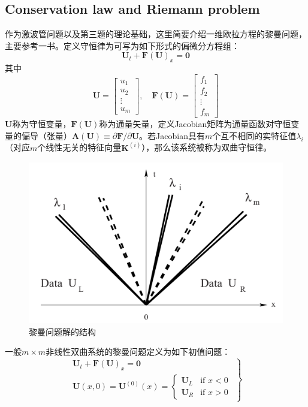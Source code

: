\documentclass[11pt]{article}
\begin{document}
\subsection{Conservation law and Riemann problem}
作为激波管问题以及第三题的理论基础，这里简要介绍一维欧拉方程的黎曼问题，主要参考\citet{toro_riemann_2009}一书。定义守恒律为可写为如下形式的偏微分方程组：
\begin{equation}
	\bm{U}_t+\bm{F}(\bm{U})_x=\bm{0}
\end{equation}
其中
\begin{equation}
	\bm{U}=\left[\begin{matrix}
			u_1    \\
			u_2    \\
			\vdots \\
			u_m
		\end{matrix}\right],\quad
	\bm{F}(\bm{U})=\left[\begin{matrix}
			f_1    \\
			f_2    \\
			\vdots \\
			f_m
		\end{matrix}\right]
\end{equation}
$\bm{U}$称为守恒变量，$\bm{F}(\bm{U})$称为通量矢量，定义Jacobian矩阵为通量函数对守恒变量的偏导（张量）$\bm{A}(\bm{U})\equiv\partial\bm{F}/\partial\bm{U}$。若Jacobian具有$m$个互不相同的实特征值$\lambda_i$（对应$m$个线性无关的特征向量$\bm{K}^{(i)}$），那么该系统被称为双曲守恒律。

\begin{figure}[htbp]
	\centering
	\includegraphics[width=.4\linewidth]{figure/shocktube/riemann.png}
	\caption{\label{fig:riemann}黎曼问题解的结构}
\end{figure}

一般$m\times m$非线性双曲系统的黎曼问题定义为如下初值问题：
\begin{equation}
	\left.\begin{array}{l}
		\bm{U}_t+\bm{F}(\bm{U})_x=\bm{0} \\
		\bm{U}(x,0)=\bm{U}^{(0)}(x)=\left\{\begin{array}{ll}
			\bm{U}_L & \text{if }x<0 \\
			\bm{U}_R & \text{if }x>0
		\end{array}\right.
	\end{array}\right\}
\end{equation}
\end{document}
